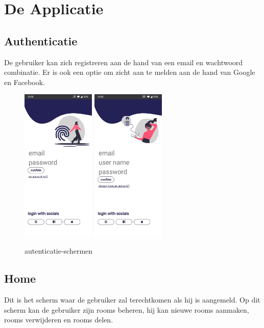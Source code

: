 \section{De Applicatie}
	\subsection{Authenticatie}
		De gebruiker kan zich registreren aan de hand van een email en wachtwoord combinatie. Er is ook een optie om zicht aan te melden aan de hand van Google en Facebook.
		
		
		\begin{figure}[H]
			\centering
			\includegraphics[width=35mm]{./img/POC/login.jpg}{}		\includegraphics[width=35mm]{./img/POC/register.jpg}{}
			\caption{autenticatie-schermen}
		\end{figure}
		
	\subsection{Home}
		Dit is het scherm waar de gebruiker zal terechtkomen als hij is aangemeld. 
		Op dit scherm kan de gebruiker zijn rooms beheren, hij kan nieuwe rooms aanmaken, rooms verwijderen en rooms delen.
		

